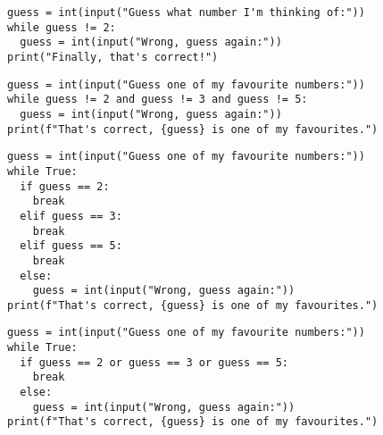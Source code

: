 \begin{frame}[fragile]
  \begin{example}
    \begin{lstlisting}
guess = int(input("Guess what number I'm thinking of:"))
while guess != 2:
  guess = int(input("Wrong, guess again:"))
print("Finally, that's correct!")
    \end{lstlisting}
  \end{example}
\end{frame}

\begin{frame}[fragile]
  \begin{example}
    \begin{lstlisting}
guess = int(input("Guess one of my favourite numbers:"))
while guess != 2 and guess != 3 and guess != 5:
  guess = int(input("Wrong, guess again:"))
print(f"That's correct, {guess} is one of my favourites.")
    \end{lstlisting}
  \end{example}
\end{frame}

\begin{frame}[fragile]
  \begin{example}
    \begin{lstlisting}
guess = int(input("Guess one of my favourite numbers:"))
while True:
  if guess == 2:
    break
  elif guess == 3:
    break
  elif guess == 5:
    break
  else:
    guess = int(input("Wrong, guess again:"))
print(f"That's correct, {guess} is one of my favourites.")
    \end{lstlisting}
  \end{example}
\end{frame}

\begin{frame}[fragile]
  \begin{example}
    \begin{lstlisting}
guess = int(input("Guess one of my favourite numbers:"))
while True:
  if guess == 2 or guess == 3 or guess == 5:
    break
  else:
    guess = int(input("Wrong, guess again:"))
print(f"That's correct, {guess} is one of my favourites.")
    \end{lstlisting}
  \end{example}
\end{frame}

